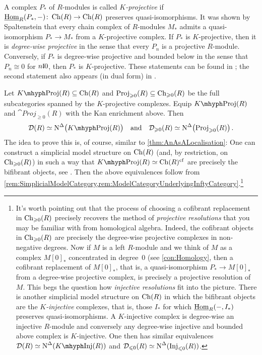 \begin{numpar}
	A complex $P_*$ of $R$-modules is called \emph{$K$-projective} if $\operatorname{\underline{Hom}}_R(P_*,-)\colon \operatorname{Ch}(R)\rightarrow \operatorname{Ch}(R)$ preserves quasi-isomorphisms. It was shown by Spaltenstein \cite{KProjective} that every chain complex of $R$-modules $M_*$ admits a quasi-isomorphism $P_*\rightarrow M_*$ from a $K$-projective complex. If $P_*$ is $K$-projective, then it is \emph{degree-wise projective} in the sense that every $P_n$ is a projective $R$-module. Conversely, if $P_*$ is degree-wise projective and bounded below in the sense that $P_n\cong0$ for $n\lle 0$, then $P_*$ is $K$-projective. These statements can be found in \cite[Lemma~\href{https://people.math.rochester.edu/faculty/doug/otherpapers/hovey-model-cats.pdf\#page=52}{2.3.6}]{HoveyModelCategories}; the second statement also appears (in dual form) in \cite[]{Stacks}.
	
	Let $K\mhyph\cat{Proj}(R)\subseteq\Ch(R)$ and $\mathrm{Proj}_{\geqslant 0}(R)\subseteq \operatorname{Ch}_{\geqslant 0}(R)$ be the full subcategories spanned by the $K$-projective complexes. Equip $K\mhyph\cat{Proj}(R)$ and $\cat{Proj}_{\geqslant 0}(R)$ with the Kan enrichment above. Then
	\begin{equation*}
		\Dd(R)\simeq \N^\Delta\bigl(K\mhyph\cat{Proj}(R)\bigr)\quad\text{and}\quad \Dd_{\geqslant 0}(R)\simeq \N^\Delta\bigl(\cat{Proj}_{\geqslant 0}(R)\bigr)\,.
	\end{equation*}
	The idea to prove this is, of course, similar to \cref{thm:AnAsALocalisation}: One can construct a simplicial model structure on $\operatorname{Ch}(R)$ (and, by restriction, on $\operatorname{Ch}_{\geqslant 0}(R)$) in such a way that $K\mhyph\cat{Proj}(R)\simeq \Ch(R)^\mathrm{cf}$ are precisely the bifibrant objects, see \cite[\S\href{https://people.math.rochester.edu/faculty/doug/otherpapers/hovey-model-cats.pdf\#page=50}{2.3}]{HoveyModelCategories}. Then the above equivalences follow from \cref{rem:SimplicialModelCategory,rem:ModelCategoryUnderlyingInftyCategory}.\footnote{It's worth pointing out that the process of choosing a cofibrant replacement in $\operatorname{Ch}_{\geqslant 0}(R)$ precisely recovers the method of \emph{projective resolutions} that you may be familiar with from homological algebra. Indeed, the cofibrant objects in $\operatorname{Ch}_{\geqslant 0}(R)$ are precisely the degree-wise projective complexes in non-negative degrees. Now if $M$ is a left $R$-module and we think of $M$ as a complex $M[0]_*$ concentrated in degree~$0$ (see \cref{con:Homology}, then a cofibrant replacement of $M[0]_*$, that is, a quasi-isomorphism $P_*\rightarrow M[0]_*$ from a degree-wise projective complex, is precisely a projective resolution of $M$. This begs the question how \emph{injective resolutions} fit into the picture. There is another simplicial model structure on $\operatorname{Ch}(R)$ in which the bifibrant objects are the \emph{$K$-injective} complexes, that is, those $I_*$ for which $\operatorname{\underline{Hom}}_R(-,I_*)$ preserves quasi-isomorphisms. A $K$-injective complex is degree-wise an injective $R$-module and conversely any degree-wise injective and bounded above complex is $K$-injective. One then has similar equivalences $\Dd(R)\simeq \N^\Delta(K\mhyph\cat{Inj}(R))$ and $\mathcal{D}_{\leqslant 0}(R)\simeq \operatorname{N}^\Delta(\mathrm{Inj}_{\leqslant 0}(R))$.}
	

\end{numpar}
